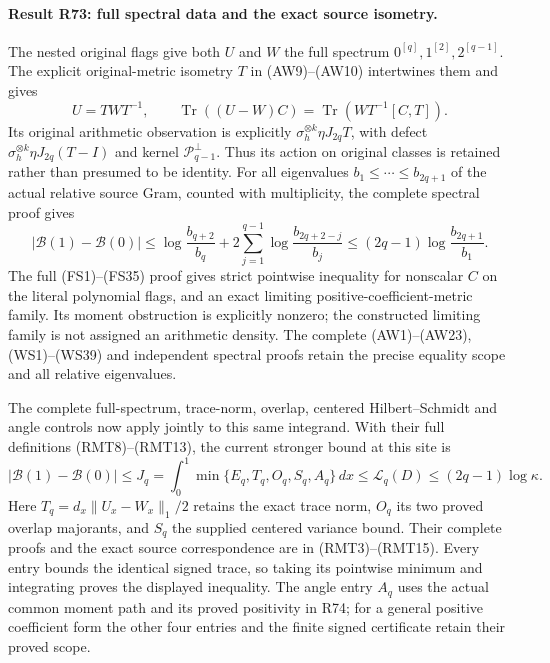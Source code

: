 \paragraph{Result R73: full spectral data and the exact source isometry.}
The nested original flags give both $U$ and $W$ the full
spectrum $0^{[q]},1^{[2]},2^{[q-1]}$.
The explicit original-metric isometry $T$ in (AW9)--(AW10)
intertwines them and gives
\[
U=TWT^{-1},\qquad
\operatorname{Tr}((U-W)C)=\operatorname{Tr}(WT^{-1}[C,T]).
\]
Its original arithmetic observation is explicitly
$\sigma_h^{\otimes k}\eta J_{2q}T$, with defect
$\sigma_h^{\otimes k}\eta J_{2q}(T-I)$ and kernel
$\mathcal P_{q-1}^{\perp}$. Thus its action on original
classes is retained rather than presumed to be identity.
For all eigenvalues $b_1\le\cdots\le b_{2q+1}$ of the
actual relative source Gram, counted with multiplicity,
the complete spectral proof gives
\[
|\mathcal B(1)-\mathcal B(0)|
\le\log\frac{b_{q+2}}{b_q}
 +2\sum_{j=1}^{q-1}\log\frac{b_{2q+2-j}}{b_j}
\le(2q-1)\log\frac{b_{2q+1}}{b_1}.
\]
The full (FS1)--(FS35) proof gives strict pointwise
inequality for nonscalar $C$ on the literal polynomial
flags, and an exact limiting positive-coefficient-metric
family. Its moment obstruction is explicitly nonzero;
the constructed limiting family is not assigned an
arithmetic density. The complete (AW1)--(AW23), (WS1)--(WS39)
and independent spectral proofs retain the precise
equality scope and all relative eigenvalues.


The complete full-spectrum, trace-norm, overlap, centered
Hilbert--Schmidt and angle controls now apply jointly to
this same integrand.  With their full definitions
(RMT8)--(RMT13), the current stronger bound at this site is
\[
 |\mathcal B(1)-\mathcal B(0)|
 \leq J_q=\int_0^1\min\{E_q,T_q,O_q,S_q,A_q\}\,dx
 \leq\mathcal L_q(D)\leq(2q-1)\log\kappa .
\]
Here \(T_q=d_x\|U_x-W_x\|_1/2\) retains the exact trace
norm, \(O_q\) its two proved overlap majorants, and
\(S_q\) the supplied centered variance bound.  Their
complete proofs and the exact source correspondence are
in (RMT3)--(RMT15).  Every entry bounds the identical
signed trace, so taking its pointwise minimum and
integrating proves the displayed inequality.
The angle entry \(A_q\) uses the actual common moment
path and its proved positivity in R74; for a general
positive coefficient form the other four entries and
the finite signed certificate retain their proved scope.

